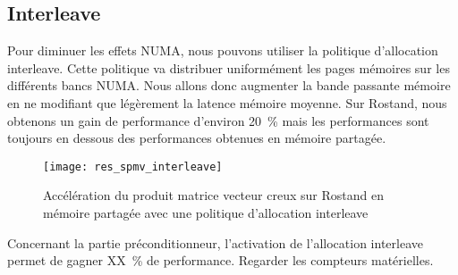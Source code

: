 \subsection{Interleave}
Pour diminuer les effets NUMA, nous pouvons utiliser la politique d'allocation interleave.
%
Cette politique va distribuer uniformément les pages mémoires sur les différents bancs NUMA.
%
Nous allons donc augmenter la bande passante mémoire en ne modifiant que légèrement la latence mémoire moyenne.
%
Sur Rostand, nous obtenons un gain de performance d'environ 20~\% mais les performances sont toujours en dessous des performances obtenues en mémoire partagée.




\begin{figure}[t!]
  \centering
  \texttt{[image: res\_spmv\_interleave]}
  \caption{Accélération du produit matrice vecteur creux sur Rostand en mémoire partagée avec une politique d'allocation interleave}
  \label{fig:res_spmv_interleave_rostand}
\end{figure}


Concernant la partie préconditionneur, l'activation de l'allocation interleave permet de gagner XX~\% de performance.
%
Regarder les compteurs matérielles.
